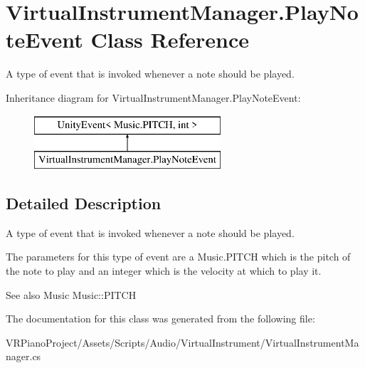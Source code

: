 \hypertarget{class_virtual_instrument_manager_1_1_play_note_event}{}\section{Virtual\+Instrument\+Manager.\+Play\+Note\+Event Class Reference}
\label{class_virtual_instrument_manager_1_1_play_note_event}


A type of event that is invoked whenever a note should be played.  


Inheritance diagram for Virtual\+Instrument\+Manager.\+Play\+Note\+Event\+:\begin{figure}[H]
\begin{center}
\leavevmode
\includegraphics[height=2.000000cm]{class_virtual_instrument_manager_1_1_play_note_event}
\end{center}
\end{figure}


\subsection{Detailed Description}
A type of event that is invoked whenever a note should be played. 

The parameters for this type of event are a Music.\+P\+I\+T\+CH which is the pitch of the note to play and an integer which is the velocity at which to play it.

\begin{DoxySeeAlso}{See also}
Music Music\+::\+P\+I\+T\+CH 
\end{DoxySeeAlso}


The documentation for this class was generated from the following file\+:\begin{DoxyCompactItemize}
\item 
V\+R\+Piano\+Project/\+Assets/\+Scripts/\+Audio/\+Virtual\+Instrument/Virtual\+Instrument\+Manager.\+cs\end{DoxyCompactItemize}
